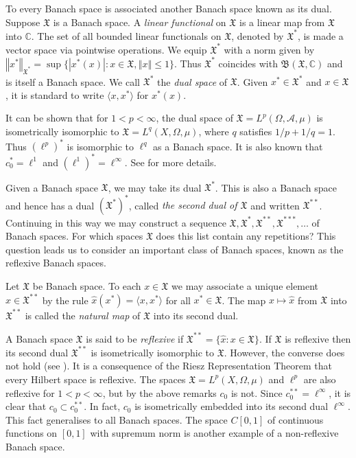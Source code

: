 \documentclass[mmath,12pt]{unswthesis}   %
\newcommand{\C}{\mathbb{C}}
\newcommand{\B}{\mathfrak{B}}
\newcommand{\X}{\mathfrak{X}}
\newcommand{\A}{\mathcal{A}}
\newcommand{\hatt}[1]{\widehat #1}
\def\ip<#1,#2>{\langle #1,#2 \rangle}
\def\lp{\ell^p}
\def\norm#1{\left \Vert #1 \right \Vert}
\numberwithin{equation}{section}
\begin{document}
To every Banach space is associated another Banach space known as its dual.
Suppose $\X$ is a Banach space. A {\em linear functional} on $\X$ is a linear
map from $\X$ into $\C$. The set of all bounded linear functionals on $\X$,
denoted
by $\X^*$, is made a vector space via pointwise operations. We equip $\X^*$ with
a norm given by $\norm{x^*}_{\X^*}=\sup\{|x^*(x)|:x\in\X,\norm{x}\leq 1\}$.
Thus $\X^*$ coincides with $\B(\X,\C)$ and is itself a Banach
space. We call $\X^*$ the {\em dual space} of $\X$. Given $x^*\in\X^*$ and
$x\in\X$, it is standard to write
$\ip<x,x^*>$ for $x^*(x)$.

It can be shown that for $1<p<\infty$, the dual space of $\X=L^p(\Omega,\A,\mu)$
is isometrically isomorphic to $\X=L^q(X,\Omega,\mu)$, where $q$ satisfies
$1/p+1/q=1$. Thus $(\lp)^*$ is isomorphic to $\ell^q$ as a Banach space. It is
also known that $c_0^*=\ell^1$ and $(\ell^1)^*=\ell^{\infty}$. See
\cite[Chapter III, \S 5 and \S 11]{Con} for more details.

Given a Banach space $\X$, we may take its dual $\X^*$. This is also a Banach
space and hence has a dual $(\X^*)^*$, called {\em the second dual of $\X$}
and written $\X^{**}$. Continuing in this way we may construct a sequence
$\X,\X^*,\X^{**},\X^{***},\ldots$ of Banach spaces. For which
spaces $\X$ does this list contain any repetitions? This question leads us to
consider an important class of Banach spaces, known as the reflexive Banach
spaces.

Let $\X$ be Banach space. To each $x\in\X$ we may associate a unique element
$\hatt{x}\in\X^{**}$ by the rule $\hatt{x}(x^*)=\ip<x,x^*>$ for all $x^*\in\X$.
The map $x\mapsto\hatt{x}$ from $\X$ into $\X^{**}$ is called the {\em natural
map} of $\X$ into its second dual.

A Banach space $\X$ is said to be {\em reflexive} if
$\X^{**}=\{\hatt{x}:x\in\X\}$. If $\X$ is reflexive then its second dual
$\X^{**}$ is isometrically isomorphic to $\X$. However, the converse does not
hold (see \cite[III.11]{Con}). It is a consequence of the Riesz Representation
Theorem \cite[I.3.4]{Con} that every Hilbert space is reflexive.
The spaces $\X=L^p(X,\Omega,\mu)$ and
$\lp$ are also reflexive for $1<p<\infty$, but by the above remarks $c_0$ is 
not. Since
$c_0^{**}=\ell^{\infty}$, it is clear that $c_0\subset c_0^{**}$. In fact,
$c_0$ is isometrically embedded into its second dual $\ell^{\infty}$. This fact
generalises to
all Banach spaces. The space $C[0,1]$ of continuous functions on $[0,1]$ with
supremum norm is another example of a non-reflexive Banach space.
\end{document}
